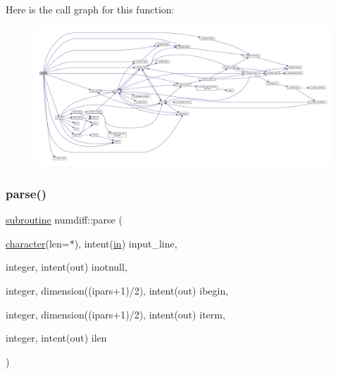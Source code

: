Here is the call graph for this function\+:
\nopagebreak
\begin{figure}[H]
\begin{center}
\leavevmode
\includegraphics[width=350pt]{numdiff_8f90_a5af23474c4d2e32d7426907cf2536366_cgraph}
\end{center}
\end{figure}
\mbox{\label{numdiff_8f90_a78c07a4665edf04b67eaeeb072b4e115}} 
\subsubsection{\texorpdfstring{parse()}{parse()}}
{\footnotesize\ttfamily \hyperlink{M__stopwatch_83_8txt_acfbcff50169d691ff02d4a123ed70482}{subroutine} numdiff\+::parse (\begin{DoxyParamCaption}\item[{\hyperlink{option__stopwatch_83_8txt_abd4b21fbbd175834027b5224bfe97e66}{character}(len=$\ast$), intent(\hyperlink{M__journal_83_8txt_afce72651d1eed785a2132bee863b2f38}{in})}]{input\+\_\+line,  }\item[{integer, intent(out)}]{inotnull,  }\item[{integer, dimension((ipars+1)/2), intent(out)}]{ibegin,  }\item[{integer, dimension((ipars+1)/2), intent(out)}]{iterm,  }\item[{integer, intent(out)}]{ilen }\end{DoxyParamCaption})}

